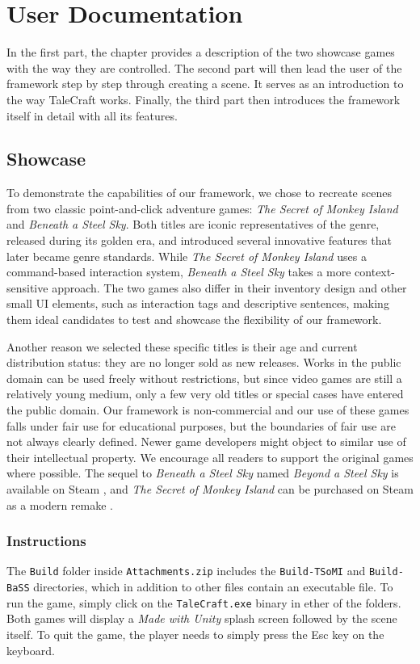 \chapter{User Documentation}
In the first part, the chapter provides a description of the two showcase games with the way they are controlled. The second part will then lead the user of the framework step by step through creating a scene. It serves as an introduction to the way TaleCraft works. Finally, the third part then introduces the framework itself in detail with all its features.


\section{Showcase}
To demonstrate the capabilities of our framework, we chose to recreate scenes from two classic point-and-click adventure games: \textit{The Secret of Monkey Island} and \textit{Beneath a Steel Sky}. Both titles are iconic representatives of the genre, released during its golden era, and introduced several innovative features that later became genre standards. While \textit{The Secret of Monkey Island} uses a command-based interaction system, \textit{Beneath a Steel Sky} takes a more context-sensitive approach. The two games also differ in their inventory design and other small UI elements, such as interaction tags and descriptive sentences, making them ideal candidates to test and showcase the flexibility of our framework.

Another reason we selected these specific titles is their age and current distribution status: they are no longer sold as new releases. Works in the public domain can be used freely without restrictions, but since video games are still a relatively young medium, only a few very old titles or special cases have entered the public domain.
Our framework is non-commercial and our use of these games falls under fair use for educational purposes, but the boundaries of fair use are not always clearly defined. 
Newer game developers might object to similar use of their intellectual property. We encourage all readers to support the original games where possible. The sequel to \textit{Beneath a Steel Sky} named \textit{Beyond a Steel Sky} is available on Steam \cite{Beyond-a-Steel-Sky}, and \textit{The Secret of Monkey Island} can be purchased on Steam as a modern remake \cite{TSoMI-steam}.

\subsection{Instructions}
The \verb|Build| folder inside \verb|Attachments.zip| includes the \verb|Build-TSoMI| and \verb|Build-BaSS| directories, which in addition to other files contain an executable file. To run the game, simply click on the \verb|TaleCraft.exe| binary in ether of the folders. Both games will display a \textit{Made with Unity }splash screen followed by the scene itself. To quit the game, the player needs to simply press the Esc key on the keyboard.

